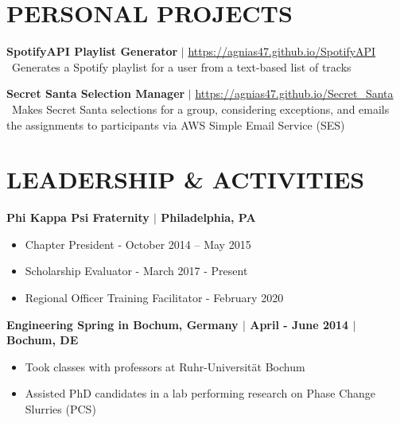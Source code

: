 \documentclass[line,resmargin,11pt]{res}
\begin{document}
\begin{resume}
\section{PERSONAL PROJECTS}

\textbf{SpotifyAPI Playlist Generator} $|$ \url{https://agnias47.github.io/SpotifyAPI} \\
\textbullet\ Generates a Spotify playlist for a user from a text-based list of tracks

\textbf{Secret Santa Selection Manager} $|$ \url{https://agnias47.github.io/Secret_Santa} \\
\textbullet\ Makes Secret Santa selections for a group, considering exceptions, and emails the assignments to participants via AWS Simple Email Service (SES)

				
\section{LEADERSHIP \& ACTIVITIES}
				\textbf{Phi Kappa Psi Fraternity $|$ Philadelphia, PA} \\
				\begin{itemize} \itemsep -2pt
				\item  Chapter President - October 2014 – May 2015
				\item Scholarship Evaluator - March 2017 - Present
				\item  Regional Officer Training Facilitator - February 2020
				\end{itemize}
				
				\textbf{Engineering Spring in Bochum, Germany  $|$ April - June 2014 $|$ Bochum, DE} \\
				\begin{itemize} \itemsep -2pt
				\item  Took classes with professors at Ruhr-Universität Bochum
				\item Assisted PhD candidates in a lab performing research on Phase Change Slurries (PCS)
				\end{itemize}

\end{resume}
\end{document}
